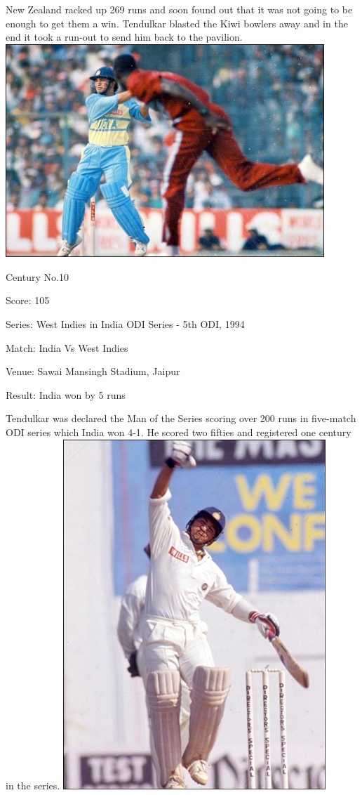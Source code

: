 \documentclass[11pt, a4paper]{article}
\begin{document}
New Zealand racked up 269 runs and soon found out that it was not going to be enough to get them a win. Tendulkar blasted the Kiwi bowlers away and in the end it took a run-out to send him back to the pavilion.
\newpage
\includegraphics[width=0.9\textwidth]{pics/10.jpg}

Century No.10 

Score: 105 

Series: West Indies in India ODI Series - 5th ODI, 1994 

Match: India Vs West Indies 

Venue: Sawai Mansingh Stadium, Jaipur 

Result: India won by 5 runs 

Tendulkar was declared the Man of the Series scoring over 200 runs in five-match ODI series which India won 4-1. He scored two fifties and registered one century in the series.
\newpage
\includegraphics[height=0.8\textheight]{pics/11.jpg}
\end{document}
